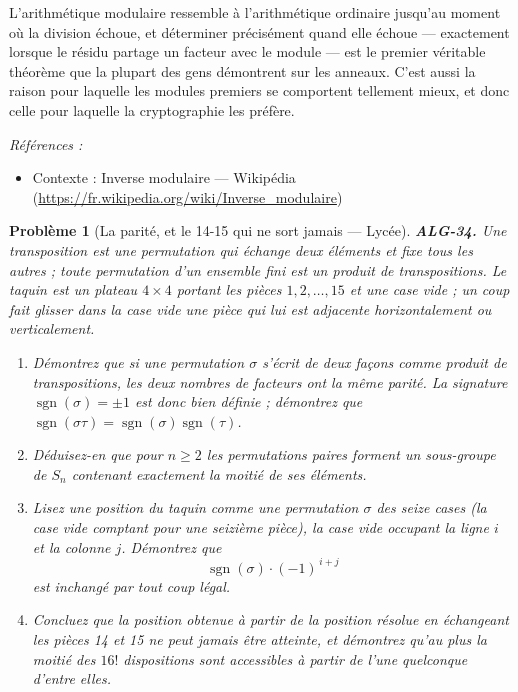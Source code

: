 \documentclass[11pt]{article}
\newtheorem{problem}{Problème}
\newenvironment{refs}{\par\small\noindent\emph{Références :}\begin{itemize}\setlength\itemsep{0pt}}{\end{itemize}\normalsize}
\begin{document}
\noindent L'arithmétique modulaire ressemble à l'arithmétique ordinaire jusqu'au moment où la division échoue, et déterminer précisément quand elle échoue --- exactement lorsque le résidu partage un facteur avec le module --- est le premier véritable théorème que la plupart des gens démontrent sur les anneaux. C'est aussi la raison pour laquelle les modules premiers se comportent tellement mieux, et donc celle pour laquelle la cryptographie les préfère.

\begin{refs}
\item Contexte : Inverse modulaire --- Wikipédia (\url{https://fr.wikipedia.org/wiki/Inverse_modulaire})
\end{refs}

\bigskip

\begin{problem}[{La parité, et le 14-15 qui ne sort jamais --- Lycée}]
\textbf{ALG-34.} Une \textit{transposition} est une permutation qui échange deux éléments et fixe
tous les autres ; toute permutation d'un ensemble fini est un produit de transpositions. Le \textit{taquin}
est un plateau $4 \times 4$ portant les pièces $1, 2, \dots, 15$ et une case vide ; un coup fait glisser
dans la case vide une pièce qui lui est adjacente horizontalement ou verticalement.
\begin{enumerate}
\item[(a)] Démontrez que si une permutation $\sigma$ s'écrit de deux façons comme produit de
transpositions, les deux nombres de facteurs ont la même parité. La \textit{signature}
$\operatorname{sgn}(\sigma) = \pm 1$ est donc bien définie ; démontrez que
$\operatorname{sgn}(\sigma\tau) = \operatorname{sgn}(\sigma)\operatorname{sgn}(\tau)$.
\item[(b)] Déduisez-en que pour $n \ge 2$ les permutations paires forment un sous-groupe de $S_n$ contenant
exactement la moitié de ses éléments.
\item[(c)] Lisez une position du taquin comme une permutation $\sigma$ des seize cases (la case
vide comptant pour une seizième pièce), la case vide occupant la ligne $i$ et la colonne $j$.
Démontrez que
\[ \operatorname{sgn}(\sigma) \cdot (-1)^{\,i+j} \]
est inchangé par tout coup légal.
\item[(d)] Concluez que la position obtenue à partir de la position résolue en échangeant les pièces 14 et 15 ne
peut jamais être atteinte, et démontrez qu'au plus la moitié des $16!$ dispositions sont accessibles à
partir de l'une quelconque d'entre elles.
\end{enumerate}

\end{problem}
\end{document}
